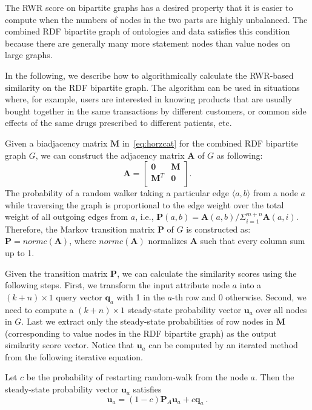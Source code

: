 The RWR score on bipartite graphs has a desired property that it is easier to compute when the numbers of nodes in the two parts are highly unbalanced. The combined RDF bipartite graph of ontologies and data satisfies this condition because there are generally many more statement nodes than value nodes on large graphs.

In the following, we describe how to algorithmically calculate the RWR-based similarity on the RDF bipartite graph. The algorithm can be used in situations where, for example, users are interested in knowing products that are usually bought together in the same transactions by different customers, or common side effects of the same drugs prescribed to different patients, etc.

Given a biadjacency matrix $\mathbf{M}$ in~\ref{eq:horzcat} for the combined RDF bipartite graph $G$, we can construct the adjacency matrix $\mathbf{A}$ of $G$ as following:
\[
\mathbf{A}=\left[
               \begin{array}{cc}
                 \mathbf{0}   & \mathbf{M} \\
                 \mathbf{M}^T & \mathbf{0} \\
               \end{array}
             \right].
\]
The probability of a random walker taking a particular edge $\langle a,b\rangle$ from a node $a$ while traversing the graph is proportional to the edge weight over the total weight of all outgoing edges from $a$, i.e., $\mathbf{P}(a,b)=\mathbf{A}(a,b)/\Sigma_{i=1}^{m+n}\mathbf{A}(a,i)$. Therefore, the Markov transition matrix $\mathbf{P}$ of $G$ is constructed as: $\mathbf{P}=normc(\mathbf{A})$, where $normc(\mathbf{A})$ normalizes $\mathbf{A}$ such that every column sum up to 1.

Given the transition matrix $\mathbf{P}$, we can calculate the similarity scores using the following steps. First, we transform the input attribute node $a$ into a $(k+n) \times 1$ query vector $\mathbf{q}_a$ with 1 in the $a$-th row and 0 otherwise. Second, we need to compute a $(k+n)\times 1$ steady-state probability vector $\mathbf{u}_a$ over all nodes in $G$. Last we extract only the steady-state probabilities of row nodes in $\mathbf{M}$ (corresponding to value nodes in the RDF bipartite graph) as the output similarity score vector. Notice that $\mathbf{u}_a$ can be computed by an iterated method from the following iterative equation.

Let $c$ be the probability of restarting random-walk from the node $a$. Then the steady-state probability vector $\mathbf{u}_a$ satisfies
\begin{equation}
\label{eq:steady-state}
\mathbf{u}_a=(1-c)\mathbf{P}_A\mathbf{u}_a+c\mathbf{q}_a~.
\end{equation}

